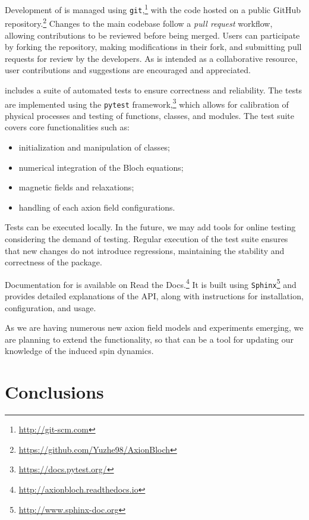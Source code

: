 \documentclass[%
 reprint,
nofootinbib,
 amsmath,amssymb,
 aps,
]{revtex4-2}
\begin{document}
Development of \axionbloch{} is managed using \texttt{git},\footnote{\url{http://git-scm.com}} with the code hosted on a public GitHub repository.\footnote{\url{https://github.com/Yuzhe98/AxionBloch}} 
Changes to the main codebase follow a \textit{pull request} workflow, allowing contributions to be reviewed before being merged. Users can participate by forking the repository, making modifications in their fork, and submitting pull requests for review by the developers.
As \axionbloch{} is intended as a collaborative resource, user contributions and suggestions are encouraged and appreciated. 

\axionbloch{} includes a suite of automated tests to ensure correctness and reliability. 
The tests are implemented using the \texttt{pytest} framework,\footnote{\url{https://docs.pytest.org/}} which allows for calibration of physical processes and testing of functions, classes, and modules. 
The test suite covers core functionalities such as:
\begin{itemize}
    \item initialization and manipulation of classes; 
    \item numerical integration of the Bloch equations;
    \item magnetic fields and relaxations;
    \item handling of each axion field configurations. 
\end{itemize}
Tests can be executed locally. In the future, we may add tools for online testing considering the demand of testing. 
Regular execution of the test suite ensures that new changes do not introduce regressions, maintaining the stability and correctness of the package.

Documentation for \axionbloch{} is available on Read the Docs.\footnote{\url{http://axionbloch.readthedocs.io}} 
It is built using \texttt{Sphinx}\footnote{\url{http://www.sphinx-doc.org}} and provides detailed explanations of the API, along with instructions for installation, configuration, and usage.

As we are having numerous new axion field models and experiments emerging, we are planning to extend the functionality, so that \axionbloch{} can be a tool for updating our knowledge of the induced spin dynamics. 

\section{Conclusions}
\label{sec:conclusions}
\end{document}
